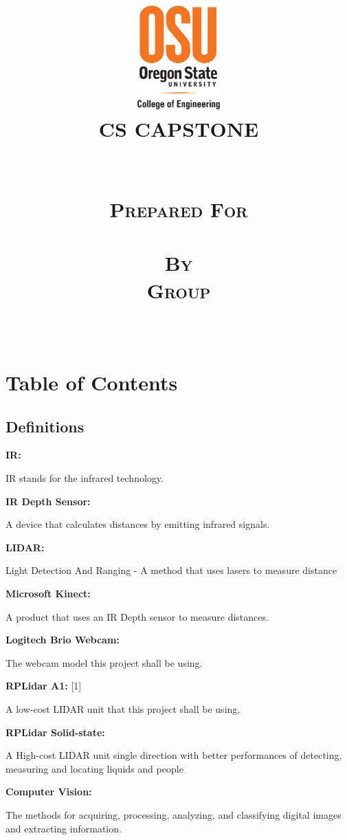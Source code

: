 \documentclass[onecolumn, draftclsnofoot,10pt, compsoc]{IEEEtran}
\date{\displaydate{date}}
\title{\centering
			\includegraphics[height=4cm,natwidth=200,natheight=300]{images/osu_logo.png}\\\vspace{.5in}
		\scshape{\huge CS CAPSTONE \DocType \\\vspace{.5in}
		\textbf{\Huge\CapstoneProjectName}\\\vspace{1in}
		\large	\displaydate{date}\\\vspace{.3in}		
			\large {Prepared For}\\\vspace{.1in}
			\textbf{{\Large \CapstoneSponsorPerson}} \\\vspace{.6in}		
				\large {By} \\\vspace{.1in}
				\textbf {Group \CapstoneTeamNumber}\\\vspace{.1in}
				\large {\CapstoneTeamName}\\\vspace{.1in}
				\textbf{ { \GroupMemberTwo}}
}  
}
\begin{document}
\maketitle
\IEEEdisplaynontitleabstractindextext
\IEEEpeerreviewmaketitle
\newpage
{}
\tableofcontents
\newpage
	
\section{Table of Contents}
\tableofcontents




 
\begin{singlespace}
	\section{Definitions}
			\textbf{IR: }\label{def:IR}\par
		IR stands for the infrared technology.

		\textbf{IR Depth Sensor: }\label{def:depthsensor}\par
		A device that calculates distances by emitting infrared signals. 
		
		\textbf{LIDAR: }\label{def:lidar}\par
		Light Detection And Ranging - A method that uses lasers to measure distance
		
		\textbf{Microsoft Kinect: }\label{def:kinect}\par
		A product that uses an IR Depth sensor to measure distances.
		
		\textbf{Logitech Brio Webcam: }\label{def:brio}\cite{logitech}\par
		The webcam model this project shall be using.
		
		\textbf{RPLidar A1: }\label{def:rplidar}[1]\cite{slamtec}\par
		A low-cost LIDAR unit that this project shall be using.
		
		\textbf{RPLidar Solid-state: }\label{def:rplidar2}\cite{leddartech}\par
		A High-cost LIDAR unit single direction with better performances of detecting, measuring and locating liquids and people
	 	
		
		\textbf{Computer Vision: }\label{def:vision}\par
		The methods for acquiring, processing, analyzing, and classifying digital images and extracting information.
		

\end{singlespace}
\end{document}
